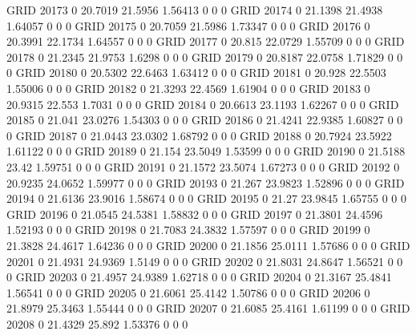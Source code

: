 GRID    20173   0       20.7019 21.5956 1.56413 0       0       0       
GRID    20174   0       21.1398 21.4938 1.64057 0       0       0       
GRID    20175   0       20.7059 21.5986 1.73347 0       0       0       
GRID    20176   0       20.3991 22.1734 1.64557 0       0       0       
GRID    20177   0       20.815  22.0729 1.55709 0       0       0       
GRID    20178   0       21.2345 21.9753 1.6298  0       0       0       
GRID    20179   0       20.8187 22.0758 1.71829 0       0       0       
GRID    20180   0       20.5302 22.6463 1.63412 0       0       0       
GRID    20181   0       20.928  22.5503 1.55006 0       0       0       
GRID    20182   0       21.3293 22.4569 1.61904 0       0       0       
GRID    20183   0       20.9315 22.553  1.7031  0       0       0       
GRID    20184   0       20.6613 23.1193 1.62267 0       0       0       
GRID    20185   0       21.041  23.0276 1.54303 0       0       0       
GRID    20186   0       21.4241 22.9385 1.60827 0       0       0       
GRID    20187   0       21.0443 23.0302 1.68792 0       0       0       
GRID    20188   0       20.7924 23.5922 1.61122 0       0       0       
GRID    20189   0       21.154  23.5049 1.53599 0       0       0       
GRID    20190   0       21.5188 23.42   1.59751 0       0       0       
GRID    20191   0       21.1572 23.5074 1.67273 0       0       0       
GRID    20192   0       20.9235 24.0652 1.59977 0       0       0       
GRID    20193   0       21.267  23.9823 1.52896 0       0       0       
GRID    20194   0       21.6136 23.9016 1.58674 0       0       0       
GRID    20195   0       21.27   23.9845 1.65755 0       0       0       
GRID    20196   0       21.0545 24.5381 1.58832 0       0       0       
GRID    20197   0       21.3801 24.4596 1.52193 0       0       0       
GRID    20198   0       21.7083 24.3832 1.57597 0       0       0       
GRID    20199   0       21.3828 24.4617 1.64236 0       0       0       
GRID    20200   0       21.1856 25.0111 1.57686 0       0       0       
GRID    20201   0       21.4931 24.9369 1.5149  0       0       0       
GRID    20202   0       21.8031 24.8647 1.56521 0       0       0       
GRID    20203   0       21.4957 24.9389 1.62718 0       0       0       
GRID    20204   0       21.3167 25.4841 1.56541 0       0       0       
GRID    20205   0       21.6061 25.4142 1.50786 0       0       0       
GRID    20206   0       21.8979 25.3463 1.55444 0       0       0       
GRID    20207   0       21.6085 25.4161 1.61199 0       0       0       
GRID    20208   0       21.4329 25.892  1.53376 0       0       0       
